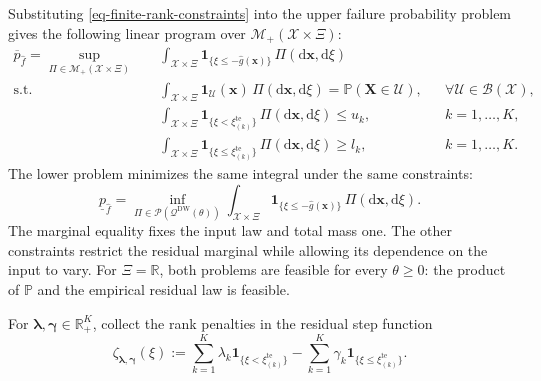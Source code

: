 \documentclass[review,11pt,3p,authoryear,nopreprintline]{elsarticle}
\begin{document}
Substituting \eqref{eq-finite-rank-constraints} into the upper failure probability problem gives the following linear program over $\mathcal M_+(\mathcal X\times\Xi)$:
\begin{equation}
  \begin{aligned}
    \overline p_{\hat f}
    =\sup_{\Pi\in\mathcal M_+(\mathcal X\times\Xi)}\quad&
      \int_{\mathcal X\times\Xi}
      \mathbf1_{\{\xi\le -\hat g(\bm x)\}}\,\Pi(\mathrm d\bm x,\mathrm d\xi)\\
    \text{s.t.}\quad&
      \int_{\mathcal X\times\Xi}
      \mathbf1_{\mathcal U}(\bm x)\,\Pi(\mathrm d\bm x,\mathrm d\xi)
      =\mathbb P(\bm X\in\mathcal U),
      &&\forall \mathcal U\in\mathcal B(\mathcal X),\\
    &\int_{\mathcal X\times\Xi}
      \mathbf1_{\{\xi<\xi_{(k)}^{\mathrm{te}}\}}\,\Pi(\mathrm d\bm x,\mathrm d\xi)\le u_k,
      &&k=1,\ldots,K,\\
    &\int_{\mathcal X\times\Xi}
      \mathbf1_{\{\xi\le \xi_{(k)}^{\mathrm{te}}\}}\,\Pi(\mathrm d\bm x,\mathrm d\xi)\ge l_k,
      &&k=1,\ldots,K.
  \end{aligned}
  \label{eq-measure-upper}
\end{equation}
The lower problem minimizes the same integral under the same constraints:
\begin{equation}
  \underline p_{\hat f}
  =\inf_{\Pi\in\mathcal P(\mathcal Q^{\mathrm{DW}}(\theta))}
    \int_{\mathcal X\times\Xi}
    \mathbf1_{\{\xi\le -\hat g(\bm x)\}}\,\Pi(\mathrm d\bm x,\mathrm d\xi).
  \label{eq-measure-lower}
\end{equation}
The marginal equality fixes the input law and total mass one. The other constraints restrict the residual marginal while allowing its dependence on the input to vary. For $\Xi=\mathbb R$, both problems are feasible for every $\theta\ge0$: the product of $\mathbb P$ and the empirical residual law is feasible.

For $\bm\lambda,\bm\gamma\in\mathbb R_+^K$, collect the rank penalties in the residual step function
\begin{equation}
  \zeta_{\bm\lambda,\bm\gamma}(\xi)
  :=\sum_{k=1}^K\lambda_k\mathbf1_{\{\xi<\xi_{(k)}^{\mathrm{te}}\}}
    -\sum_{k=1}^K\gamma_k\mathbf1_{\{\xi\le\xi_{(k)}^{\mathrm{te}}\}}.
  \label{eq-dual-step-function}
\end{equation}
\end{document}
